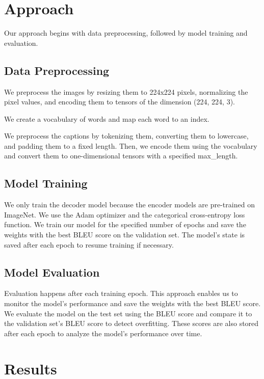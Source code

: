\documentclass[12pt]{article}
\theoremstyle{plain}
\theoremstyle{definition}
\theoremstyle{remark}
\begin{document}
\newpage
\section{Approach}
\label{sec:approach}

Our approach begins with data preprocessing, followed by model training and evaluation.

\subsection{Data Preprocessing}
\par We preprocess the images by resizing them to 224x224 pixels, normalizing the pixel values, and encoding them to tensors of the dimension (224, 224, 3).
\par We create a vocabulary of words and map each word to an index.
\par We preprocess the captions by tokenizing them, converting them to lowercase, and padding them to a fixed length. Then, we encode them using the vocabulary and convert them to one-dimensional tensors with a specified max\_length.

\subsection{Model Training}
We only train the decoder model because the encoder models are pre-trained on ImageNet. We use the Adam optimizer and the categorical cross-entropy loss function. We train our model for the specified number of epochs and save the weights with the best BLEU score on the validation set. The model's state is saved after each epoch to resume training if necessary.

\subsection{Model Evaluation}
Evaluation happens after each training epoch. This approach enables us to monitor the model's performance and save the weights with the best BLEU score. We evaluate the model on the test set using the BLEU score and compare it to the validation set's BLEU score to detect overfitting. These scores are also stored after each epoch to analyze the model's performance over time.



\newpage
\section{Results}
\label{sec:results}
\end{document}
